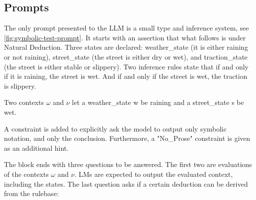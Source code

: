 \subsection{Prompts}
The only prompt presented to the LLM is a small type and inference system, see \autoref{fig:symbolic-test-prompt}.
It starts with an assertion that what follows is under Natural Deduction.
Three states are declared: weather\_state (it is either raining or not raining), 
street\_state (the street is either dry or wet), and traction\_state 
(the street is either stable or slippery). Two inference rules state that if and
only if it is raining, the street is wet. And if and only if the street is wet,
the traction is slippery.

Two contexts $\omega$ and $\nu$ let a weather\_state w be raining and a street\_state s be wet.

A constraint is added to explicitly ask the model to output only symbolic notation, and only the conclusion.
Furthermore, a "No\_Prose" constraint is given as an additional hint.

The block ends with three questions to be answered. The first two are evaluations of the contexts $\omega$ and $\nu$. 
LMs are expected to output the evaluated context, including the states. The last question asks if a certain deduction can be derived from the rulebase:

